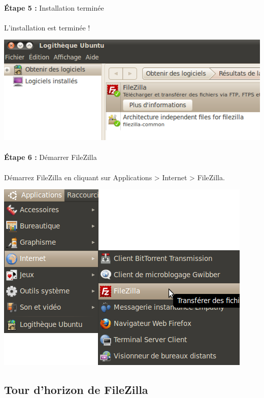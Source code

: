 \documentclass[10pt,a4paper]{article}
\begin{document}
\paragraph{}\textbf{Étape 5 : }Installation terminée
\paragraph{}L'installation est terminée !
\begin{center}
\includegraphics[scale=0.4]{img/0027.png}
\end{center}
\paragraph{}\textbf{Étape 6 : }Démarrer FileZilla
\paragraph{}Démarrez FileZilla en cliquant sur Applications > Internet > FileZilla.
\begin{center}
\includegraphics[scale=0.4]{img/0028.png}
\end{center}

\subsection{Tour d'horizon de FileZilla}
\end{document}
